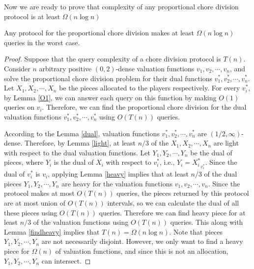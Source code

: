 Now we are ready to prove that complexity of any proportional chore division protocol is at least $\Omega( n \log n)$
\begin{theorem}
Any protocol for the proportional chore division makes at least $\Omega ( n \log n)$ queries in the worst case.
\end{theorem}
\begin{proof}
Suppose that the query complexity of a chore division protocol is $T(n)$.
Consider $n$ arbitrary positive $(0,2)$-dense valuation functions $v_1, v_2, \cdots, v_n$, and solve the proportional chore division problem for their dual functions $v^{*}_1, v^{*}_2, \cdots, v^{*}_n$. Let $X_1, X_2, \cdots, X_n$ be the pieces allocated to the players respectively. For every $v^*_i$, by Lemma \ref{O1}, we can answer each query on this function by making $O(1)$ queries on $v_i$. Therefore, we can find the proportional chore division for the dual valuation functions $v^{*}_1, v^{*}_2, \cdots, v^{*}_n$ using $O(T(n))$ queries.

According to the Lemma \ref{dual}, valuation functions  $v^{*}_1, v^{*}_2, \cdots, v^{*}_n$ are $(1/2,\infty)$-dense. Therefore, by Lemma \ref{light}, at least $n/3$ of the $X_1, X_2, \cdots, X_n$ are light with respect to the dual valuation functions. Let $Y_1, Y_2, \cdots, Y_n$ be the dual of pieces, where $Y_i$ is the dual of $X_i$ with respect to $v^*_i$, i.e., $Y_i = {X^*_i}_{v^*_i}$. Since the dual of $v^{*}_i$ is $v_i$, applying Lemma \ref{heavy} implies that at least $n/3$ of the dual pieces $Y_1, Y_2, \cdots, Y_n$ are heavy for the valuation functions $v_1, v_2, \cdots, v_n$. Since the protocol makes at most $O(T(n))$ queries, the pieces returned by this protocol are at most union of $O(T(n))$ intervals, so we can calculate the dual of all these pieces using $O(T(n))$ queries. Therefore we can find heavy piece for at least $n/3$ of the valuation functions using $O(T(n))$ queries. This along with Lemma \ref{findheavy} implies that $T(n)= \Omega( n \log n)$. Note that pieces $Y_1, Y_2, \cdots, Y_n$ are not necessarily disjoint. However, we only want to find a heavy piece for $\Omega(n)$ of valuation functions, and since this is not an allocation, $Y_1, Y_2, \cdots, Y_n$ can intersect.



\end{proof}
